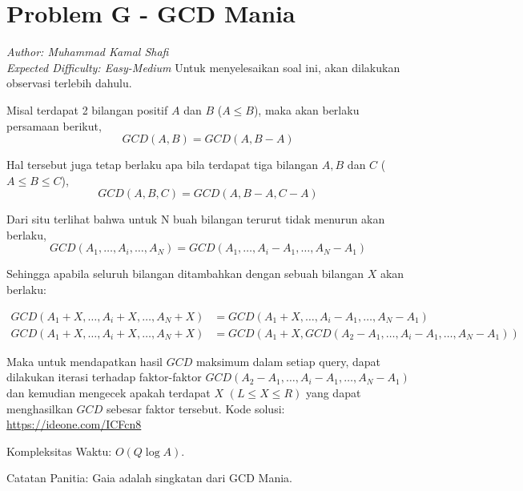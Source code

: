 \section*{Problem G - GCD Mania}
\textit{Author: Muhammad Kamal Shafi}
\\
\textit{Expected Difficulty: Easy-Medium}
\newline
\newline
Untuk menyelesaikan soal ini, akan dilakukan observasi terlebih dahulu.

Misal terdapat 2 bilangan positif $A$ dan $B$ ($A \leq B$), maka akan berlaku persamaan berikut,
$$ GCD(A, B) = GCD(A, B - A)$$

Hal tersebut juga tetap berlaku apa bila terdapat tiga bilangan $A, B$ dan $C$ ($A \leq B \leq C$),
$$ GCD(A, B, C) = GCD(A, B - A, C - A)$$

Dari situ terlihat bahwa untuk N buah bilangan terurut tidak menurun akan berlaku,
$$ GCD(A_1, \dots, A_i, \dots, A_N) = GCD(A_1, \dots, A_i - A_1, \dots, A_N - A_1)$$

Sehingga apabila seluruh bilangan ditambahkan dengan sebuah bilangan $X$ akan berlaku:

\begin{align*}
    GCD(A_1 + X, \dots, A_i + X, \dots, A_N + X) &= GCD(A_1 + X, \dots, A_i - A_1, \dots, A_N - A_1)
    \\
    GCD(A_1 + X, \dots, A_i + X, \dots, A_N + X) &= GCD(A_1 + X, GCD(A_2 - A_1, \dots, A_i - A_1, \dots, A_N - A_1))
\end{align*}


Maka untuk mendapatkan hasil $GCD$ maksimum dalam setiap query, dapat dilakukan iterasi terhadap faktor-faktor $GCD(A_2 - A_1, \dots, A_i - A_1, \dots, A_N - A_1)$ dan kemudian mengecek apakah terdapat $X$ $(L \leq X \leq R)$ yang dapat menghasilkan $GCD$ sebesar faktor tersebut.
\newline
\newline
Kode solusi: \url{https://ideone.com/ICFcn8}

Kompleksitas Waktu: $O(Q \log A)$.

Catatan Panitia: Gaia adalah singkatan dari GCD Mania.